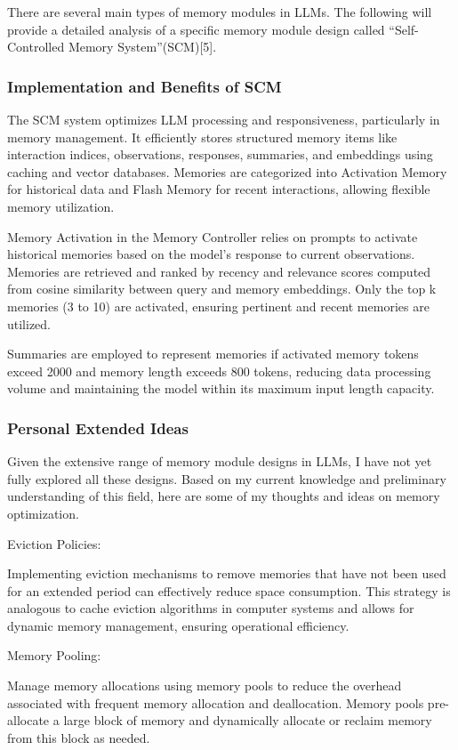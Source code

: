 \documentclass[conference]{IEEEtran}
\begin{document}
There are several main types of memory modules in LLMs. The following will provide a detailed analysis of a specific memory module design called “Self-Controlled Memory System”(SCM)[5].

\subsubsection{Implementation and Benefits of SCM}
The SCM system optimizes LLM processing and responsiveness, particularly in memory management. It efficiently stores structured memory items like interaction indices, observations, responses, summaries, and embeddings using caching and vector databases. Memories are categorized into Activation Memory for historical data and Flash Memory for recent interactions, allowing flexible memory utilization.

Memory Activation in the Memory Controller relies on prompts to activate historical memories based on the model's response to current observations. Memories are retrieved and ranked by recency and relevance scores computed from cosine similarity between query and memory embeddings. Only the top k memories (3 to 10) are activated, ensuring pertinent and recent memories are utilized.

Summaries are employed to represent memories if activated memory tokens exceed 2000 and memory length exceeds 800 tokens, reducing data processing volume and maintaining the model within its maximum input length capacity.

\subsubsection{Personal Extended Ideas}
Given the extensive range of memory module designs in LLMs, I have not yet fully explored all these designs. Based on my current knowledge and preliminary understanding of this field, here are some of my thoughts and ideas on memory optimization.

Eviction Policies:

Implementing eviction mechanisms to remove memories that have not been used for an extended period can effectively reduce space consumption. This strategy is analogous to cache eviction algorithms in computer systems and allows for dynamic memory management, ensuring operational efficiency.

Memory Pooling:

Manage memory allocations using memory pools to reduce the overhead associated with frequent memory allocation and deallocation. Memory pools pre-allocate a large block of memory and dynamically allocate or reclaim memory from this block as needed.
\end{document}
